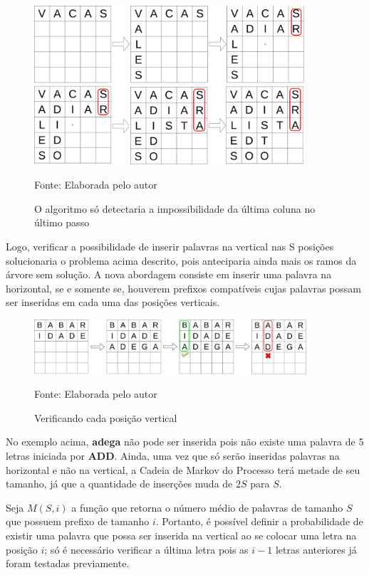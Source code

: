 \begin{figure}[H]
\centering
    \caption{O algoritmo só detectaria a impossibilidade da última coluna no último passo}
    \label{fig:scaffolding}
    \includegraphics[width=0.9\textwidth]{Figuras/bradingerror.jpg}
    
    Fonte: Elaborada pelo autor
\end{figure}

Logo, verificar a possibilidade de inserir palavras na vertical nas S posições solucionaria o problema acima descrito, pois anteciparia ainda mais os ramos da árvore sem solução. A nova abordagem consiste em inserir uma palavra na horizontal, se e somente se, houverem prefixos compatíveis cujas palavras possam ser inseridas em cada uma das posições verticais.

\begin{figure}[H]
\centering
    \caption{Verificando cada posição vertical}
    \label{fig:scaffoldingcool}
    \includegraphics[width=0.9\textwidth]{Figuras/scaffoldingcool.jpg}
    
    Fonte: Elaborada pelo autor
\end{figure}

No exemplo acima, \textbf{adega} não pode ser inserida pois não existe uma palavra de 5 letras iniciada por \textbf{ADD}.
Ainda, uma vez que só serão inseridas palavras na horizontal e não na vertical, a Cadeia de Markov do Processo terá metade de seu tamanho, já que a quantidade de inserções muda de $2S$ para $S$.

Seja $M(S,i)$ a função que retorna o número médio de palavras de tamanho $S$ que possuem prefixo de tamanho $i$. Portanto, é possível definir a probabilidade de existir uma palavra que possa ser inserida na vertical ao se colocar uma letra na posição $i$; só é necessário verificar a última letra pois as $i-1$ letras anteriores já foram testadas previamente.

